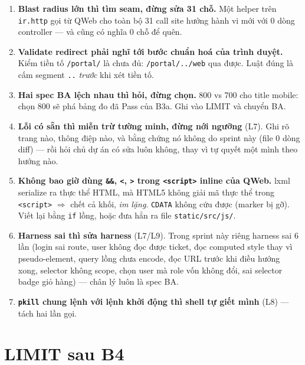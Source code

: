 \begin{enumerate}
\item \textbf{Blast radius lớn thì tìm seam, đừng sửa 31 chỗ.} Một helper trên
  \texttt{ir.http} gọi từ QWeb cho toàn bộ 31 call site hưởng hành vi mới với 0 dòng
  controller --- và cũng có nghĩa 0 chỗ để quên.
\item \textbf{Validate redirect phải nghĩ tới bước chuẩn hoá của trình duyệt.} Kiểm tiền tố
  \texttt{/portal/} là chưa đủ: \texttt{/portal/../web} qua được. Luật đúng là cấm segment
  \texttt{..} \emph{trước} khi xét tiền tố.
\item \textbf{Hai spec BA lệch nhau thì hỏi, đừng chọn.} 800 vs 700 cho title mobile: chọn 800
  sẽ phá bảng đo đã Pass của B3a. Ghi vào LIMIT và chuyển BA.
\item \textbf{Lỗi có sẵn thì miễn trừ tường minh, đừng nới ngưỡng} (L7). Ghi rõ trang nào,
  thông điệp nào, và bằng chứng nó không do sprint này (file 0 dòng diff) --- rồi hỏi chủ dự
  án có sửa luôn không, thay vì tự quyết một mình theo hướng nào.
\item \textbf{Không bao giờ dùng \texttt{\&\&}, \texttt{<}, \texttt{>} trong \texttt{<script>}
  inline của QWeb.} lxml serialize ra thực thể HTML, mà HTML5 không giải mã thực thể trong
  \texttt{<script>} $\Rightarrow$ chết cả khối, \emph{im lặng}. \texttt{CDATA} không cứu được
  (marker bị gỡ). Viết lại bằng \texttt{if} lồng, hoặc đưa hẳn ra file
  \texttt{static/src/js/}.
\item \textbf{Harness sai thì sửa harness} (L7/L9). Trong sprint này riêng harness sai 6 lần
  (login sai route, user không đọc được ticket, đọc computed style thay vì pseudo-element,
  query lồng chưa encode, đọc URL trước khi điều hướng xong, selector không scope, chọn user
  mà role vốn không đổi, sai selector badge giỏ hàng) --- chân lý luôn là spec BA.
\item \textbf{\texttt{pkill} chung lệnh với lệnh khởi động thì shell tự giết mình} (L8) ---
  tách hai lần gọi.
\end{enumerate}

\section{LIMIT sau B4}

